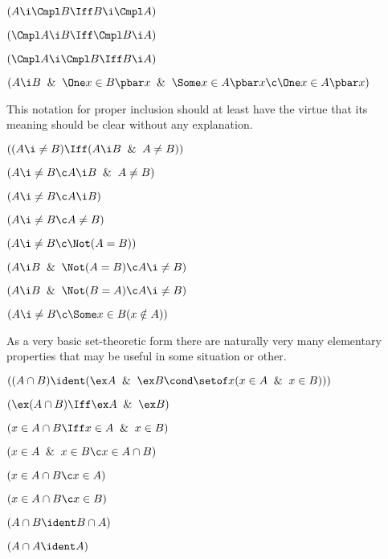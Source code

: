  $(A \i \Cmpl B \Iff B \i \Cmpl A)$

 $(\Cmpl A \i B \Iff \Cmpl B  \i A)$

 $(\Cmpl A \i \Cmpl B \Iff B \i A)$

 $(A\i B \And \One x \in B \pbar x \And \Some x\in A
\pbar x \c \One x \in A \pbar x)$
\lineb


This notation for proper inclusion should at least have the virtue
that its meaning should be clear without any explanation. 


 $((A \i \ne B) \Iff (A \i B \And A \ne B))$


 $(A \i \ne B \c A \i B \And A \ne B)$

 $(A \i \ne B \c A \i B)$

 $(A \i \ne B \c A \ne B)$

 $(A \i \ne B \c \Not(A = B))$

 $(A \i B \And \Not(A = B) \c A \i \ne B)$

 $(A \i B \And \Not(B = A) \c A \i \ne B)$

 $(A \i \ne B \c \Some x \in B(x \notin A))$
\lineb


As a very basic set-theoretic form there are naturally very many elementary 
properties that may be useful in some situation or other. 
\lineb


 $((A \cap B) \ident (\ex A \And \ex B \cond \setof x(x \in A \And x \in B)))$


 $(\ex (A \cap B) \Iff \ex A \And \ex B)$

 $(x \in A \cap B \Iff x \in A \And x \in B)$

 $(x \in A \And x \in B \c x \in A \cap B)$

 $(x \in A \cap B \c x \in A)$

 $(x \in A \cap B \c x \in B)$

 $(A \cap B \ident B \cap A)$

 $(A \cap A \ident A)$

